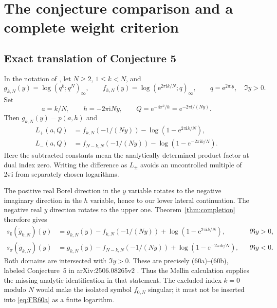 \documentclass[11pt,a4paper]{article}
\numberwithin{equation}{section}
\theoremstyle{definition}
\theoremstyle{remark}\newtheorem{remark}[theorem]{Remark}
\newcommand{\ii}{\mathrm i}\newcommand{\e}{\mathrm e}
\begin{document}
\section{The conjecture comparison and a complete weight criterion}
\label{sec:weights}

\subsection{Exact translation of Conjecture 5}
In the notation of \cite{fr}, let $N\ge2$, $1\le k<N$, and
\[
 g_{k,N}(y)=\log(q^k;q^N)_\infty,\qquad
 f_{k,N}(y)=\log(\e^{2\pi\ii k/N};q)_\infty,
 \qquad q=\e^{2\pi\ii y},\quad \Im y>0.
\]
Set
\begin{equation}\label{eq:FR-rotation}
 a=k/N,\qquad h=-2\pi\ii Ny,\qquad
 Q=\e^{-4\pi^2/h}=\e^{-2\pi\ii/(Ny)}.
\end{equation}
Then $g_{k,N}(y)=p(a,h)$ and
\begin{align*}
 L_+(a,Q)&=f_{k,N}(-1/(Ny))-\log(1-\e^{2\pi\ii k/N}),\\
 L_-(a,Q)&=f_{N-k,N}(-1/(Ny))-\log(1-\e^{-2\pi\ii k/N}).
\end{align*}
Here the subtracted constants mean the analytically determined product
factor at dual index zero. Writing the difference as $L_\pm$ avoids an
uncontrolled multiple of $2\pi\ii$ from separately chosen logarithms.

The positive real Borel direction in the $y$ variable rotates to the
negative imaginary direction in the $h$ variable, hence to our lower
lateral continuation. The negative real $y$ direction rotates to the
upper one. Theorem~\ref{thm:completion} therefore gives
\begin{align}
 s_0(\widetilde g_{k,N})(y)
 &=g_{k,N}(y)-f_{k,N}(-1/(Ny))
       +\log(1-\e^{2\pi\ii k/N}), &&\Re y>0,\label{eq:FR60a}\\
 s_\pi(\widetilde g_{k,N})(y)
 &=g_{k,N}(y)-f_{N-k,N}(-1/(Ny))
       +\log(1-\e^{-2\pi\ii k/N}), &&\Re y<0.\label{eq:FR60b}
\end{align}
Both domains are intersected with $\Im y>0$. These are precisely
(60a)--(60b), labeled Conjecture~5 in arXiv:2506.08265v2
\cite{fr}. Thus the Mellin calculation supplies the missing analytic
identification in that statement. The excluded index $k=0$ modulo $N$
would make the isolated symbol $f_{0,N}$ singular; it must not be inserted
into \eqref{eq:FR60a} as a finite logarithm.
\end{document}
